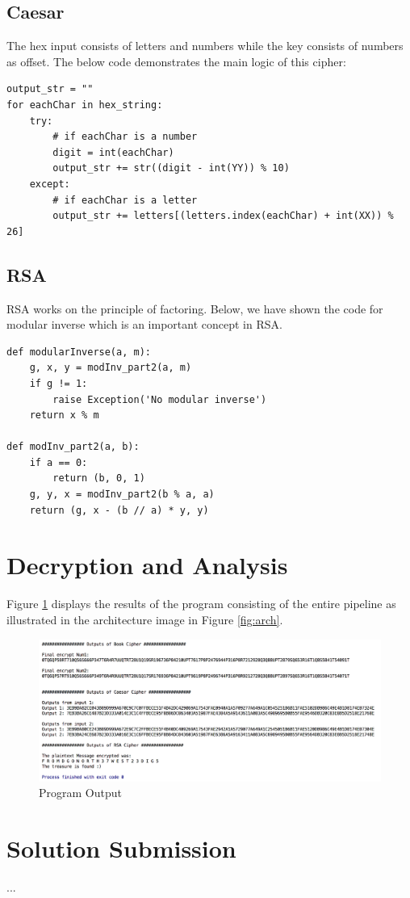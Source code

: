 \documentclass[12pt]{article}
\begin{document}
\subsection{Caesar}
The hex input consists of letters and numbers while the key consists of numbers as offset. The below code demonstrates the main logic of this cipher:
\begin{lstlisting}
output_str = ""
for eachChar in hex_string:
    try:
    	# if eachChar is a number
        digit = int(eachChar)
        output_str += str((digit - int(YY)) % 10)
    except:
    	# if eachChar is a letter
        output_str += letters[(letters.index(eachChar) + int(XX)) % 26]
\end{lstlisting}
\subsection{RSA}
RSA works on the principle of factoring. Below, we have shown the code for modular inverse which is an important concept in RSA. 
\begin{lstlisting}
def modularInverse(a, m):
    g, x, y = modInv_part2(a, m)
    if g != 1:
        raise Exception('No modular inverse')
    return x % m

def modInv_part2(a, b):
    if a == 0:
        return (b, 0, 1)
    g, y, x = modInv_part2(b % a, a)
    return (g, x - (b // a) * y, y)
\end{lstlisting}

\section{Decryption and Analysis}
Figure \ref{fig:output} displays the results of the program consisting of the entire pipeline as illustrated in the architecture image in Figure \ref{fig:arch}. 
\begin{figure}[h]
  \includegraphics[scale=0.52]{output}
  \caption{Program Output}
  \label{fig:output}
\end{figure}


\section{Solution Submission}
...



\end{document}
